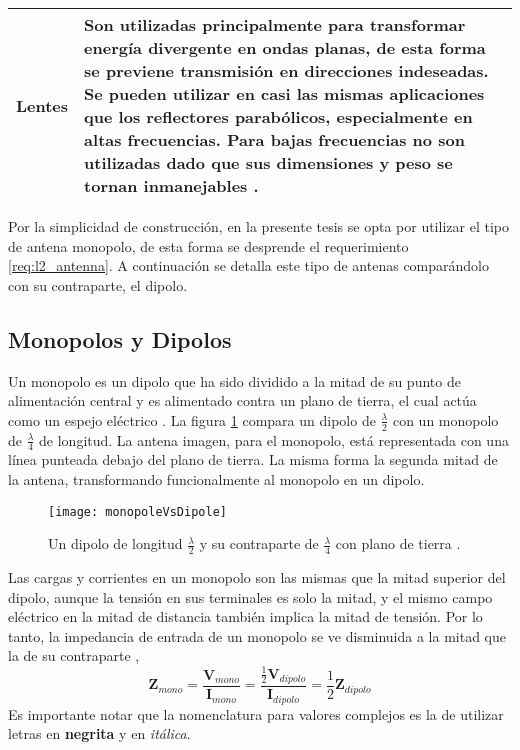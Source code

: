 \begin{table}[H]
\begin{tabular}{l p{12.5cm}}
  Lentes & Son utilizadas principalmente para transformar energía divergente en ondas planas, de esta forma se previene  transmisión en direcciones indeseadas. Se pueden utilizar en casi las mismas aplicaciones que los reflectores parabólicos, especialmente en altas frecuencias. Para bajas frecuencias no son utilizadas dado que sus dimensiones y peso se tornan inmanejables \cite{Balanis2012}. \tabularnewline
  \bottomrule 
  \end{tabular}
  \label{tab:type_antennas}
\end{table}

Por la simplicidad de construcción, en la presente tesis se opta por utilizar el tipo de antena monopolo, de esta forma se desprende el requerimiento \ref{req:l2_antenna}. A continuación se detalla este tipo de antenas comparándolo con su contraparte, el dipolo.


\subsection{Monopolos y Dipolos}

Un monopolo es un dipolo que ha sido dividido a la mitad de su punto de alimentación central y es alimentado contra un plano de tierra, el cual actúa como un espejo eléctrico \cite{arrl2007}. La figura \ref{fig:monopoles} compara un dipolo de $\frac{\lambda}{2}$ con un monopolo de $\frac{\lambda}{4}$ de longitud. La antena imagen, para el monopolo, está representada con una línea punteada debajo del plano de tierra. La misma forma la segunda mitad de la antena, transformando funcionalmente al monopolo en un dipolo.

\begin{figure}
 \centering
 \texttt{[image: monopoleVsDipole]}
 \caption{Un dipolo de longitud $\frac{\lambda}{2}$ y su contraparte de $\frac{\lambda}{4}$ con plano de tierra \cite{arrl2007}.}
 \label{fig:monopoles}
\end{figure}

Las cargas y corrientes en un monopolo son las mismas que la mitad superior del dipolo, aunque la tensión en sus terminales es solo la mitad, y el mismo campo eléctrico en la mitad de distancia también implica la mitad de tensión. Por lo tanto, la impedancia de entrada de un monopolo se ve disminuida a la mitad que la de su contraparte \cite{Stutzman2013},
\begin{equation}
\bm{Z}_{mono} = \dfrac{\bm{V}_{mono}}{\bm{I}_{mono}} = \dfrac{\frac{1}{2}\bm{V}_{dipolo}}{\bm{I}_{dipolo}} = \dfrac{1}{2}\bm{Z}_{dipolo}
\end{equation}
Es importante notar que la nomenclatura para valores complejos es la de utilizar letras en \textbf{negrita} y en \textit{itálica}.

